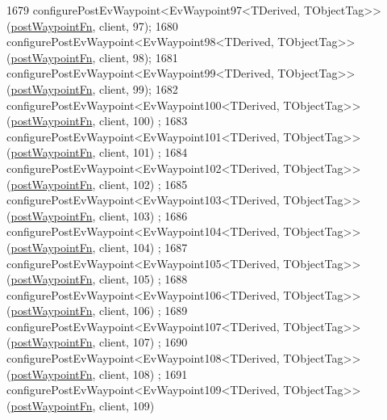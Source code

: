 \begin{DoxyCode}
1679     configurePostEvWaypoint<EvWaypoint97<TDerived, TObjectTag>>(\hyperlink{classmove__base__z__client_1_1WaypointEventDispatcher_acc538eb7506c13f7cca2268a1742dadd}{postWaypointFn}, client, 97);
1680     configurePostEvWaypoint<EvWaypoint98<TDerived, TObjectTag>>(\hyperlink{classmove__base__z__client_1_1WaypointEventDispatcher_acc538eb7506c13f7cca2268a1742dadd}{postWaypointFn}, client, 98);
1681     configurePostEvWaypoint<EvWaypoint99<TDerived, TObjectTag>>(\hyperlink{classmove__base__z__client_1_1WaypointEventDispatcher_acc538eb7506c13f7cca2268a1742dadd}{postWaypointFn}, client, 99);
1682     configurePostEvWaypoint<EvWaypoint100<TDerived, TObjectTag>>(\hyperlink{classmove__base__z__client_1_1WaypointEventDispatcher_acc538eb7506c13f7cca2268a1742dadd}{postWaypointFn}, client, 100)
      ;
1683     configurePostEvWaypoint<EvWaypoint101<TDerived, TObjectTag>>(\hyperlink{classmove__base__z__client_1_1WaypointEventDispatcher_acc538eb7506c13f7cca2268a1742dadd}{postWaypointFn}, client, 101)
      ;
1684     configurePostEvWaypoint<EvWaypoint102<TDerived, TObjectTag>>(\hyperlink{classmove__base__z__client_1_1WaypointEventDispatcher_acc538eb7506c13f7cca2268a1742dadd}{postWaypointFn}, client, 102)
      ;
1685     configurePostEvWaypoint<EvWaypoint103<TDerived, TObjectTag>>(\hyperlink{classmove__base__z__client_1_1WaypointEventDispatcher_acc538eb7506c13f7cca2268a1742dadd}{postWaypointFn}, client, 103)
      ;
1686     configurePostEvWaypoint<EvWaypoint104<TDerived, TObjectTag>>(\hyperlink{classmove__base__z__client_1_1WaypointEventDispatcher_acc538eb7506c13f7cca2268a1742dadd}{postWaypointFn}, client, 104)
      ;
1687     configurePostEvWaypoint<EvWaypoint105<TDerived, TObjectTag>>(\hyperlink{classmove__base__z__client_1_1WaypointEventDispatcher_acc538eb7506c13f7cca2268a1742dadd}{postWaypointFn}, client, 105)
      ;
1688     configurePostEvWaypoint<EvWaypoint106<TDerived, TObjectTag>>(\hyperlink{classmove__base__z__client_1_1WaypointEventDispatcher_acc538eb7506c13f7cca2268a1742dadd}{postWaypointFn}, client, 106)
      ;
1689     configurePostEvWaypoint<EvWaypoint107<TDerived, TObjectTag>>(\hyperlink{classmove__base__z__client_1_1WaypointEventDispatcher_acc538eb7506c13f7cca2268a1742dadd}{postWaypointFn}, client, 107)
      ;
1690     configurePostEvWaypoint<EvWaypoint108<TDerived, TObjectTag>>(\hyperlink{classmove__base__z__client_1_1WaypointEventDispatcher_acc538eb7506c13f7cca2268a1742dadd}{postWaypointFn}, client, 108)
      ;
1691     configurePostEvWaypoint<EvWaypoint109<TDerived, TObjectTag>>(\hyperlink{classmove__base__z__client_1_1WaypointEventDispatcher_acc538eb7506c13f7cca2268a1742dadd}{postWaypointFn}, client, 109)

\end{DoxyCode}
